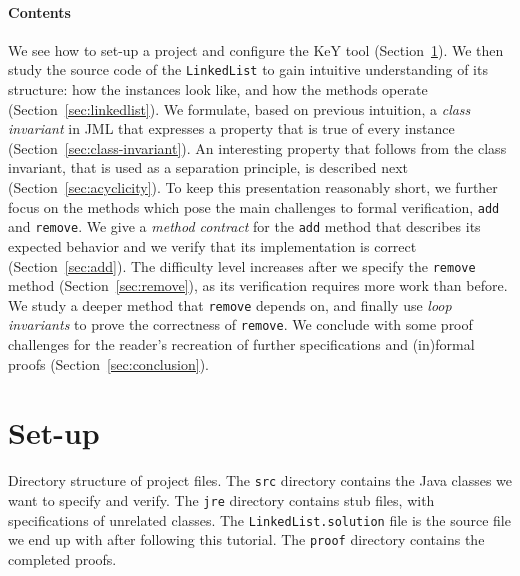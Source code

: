 \documentclass[runningheads]{llncs}
\theoremstyle{remark}
\begin{document}
\paragraph{Contents}
We see how to set-up a project and configure the KeY tool (Section~\ref{sec:setup}).
We then study the source code of the \texttt{LinkedList} to gain intuitive understanding of its structure:
how the instances look like, and how the methods operate (Section~\ref{sec:linkedlist}).
We formulate, based on previous intuition, a \emph{class invariant} in JML that expresses a property that is true of every instance (Section~\ref{sec:class-invariant}).
An interesting property that follows from the class invariant, that is used as a separation principle, is described next (Section~\ref{sec:acyclicity}).
To keep this presentation reasonably short, we further focus on the methods which pose the main challenges to formal verification, \texttt{add} and \texttt{remove}. We give a \emph{method contract} for the \texttt{add} method that describes its expected behavior and we verify that its implementation is correct (Section~\ref{sec:add}). The difficulty level increases after we specify the \texttt{remove} method (Section~\ref{sec:remove}), as its verification requires more work than before. We study a deeper method that \texttt{remove} depends on, and finally use \emph{loop invariants} to prove the correctness of \texttt{remove}.
We conclude with some proof challenges for the reader's recreation of further specifications and (in)formal proofs (Section~\ref{sec:conclusion}).

\section{Set-up}\label{sec:setup}

\begin{table}
\vspace*{-26pt}
\medskip
    \caption{Directory structure of project files. The \texttt{src} directory contains the Java classes we want to specify and verify. The \texttt{jre} directory contains stub files, with specifications of unrelated classes. The \texttt{LinkedList.solution} file is the source file we end up with after following this tutorial. The \texttt{proof} directory contains the completed proofs.}
    \vspace*{-20pt}
    \label{tab:directory-structure}
\end{table}
\end{document}

